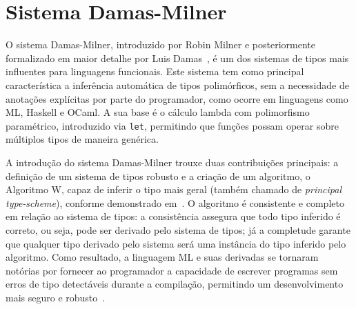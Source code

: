 \newcommand{\defas}{\ensuremath{\overset{def}{=}}}
\newcommand{\fv}{\ensuremath{\text{FV}}}
\newcommand{\fvc}{\ensuremath{\text{FVC}}}
\newcommand{\eeq}{\ensuremath{\overset{e}{=}}}
\newcommand{\Append}{\ensuremath{\texttt{++}}}
\newcommand{\If}{\ensuremath{\text{se}}}
\newcommand{\Let}{\ensuremath{\text{let}}}
\newcommand{\In}{\ensuremath{\text{in}}}
\newcommand{\Then}{\ensuremath{\text{então}}}
\newcommand{\Return}{\ensuremath{\text{retorna}}}
\newcommand{\Else}{\ensuremath{\text{senão}}}
\newcommand{\Elseif}{\ensuremath{\text{senão se}}}
\newcommand{\Fail}{\ensuremath{\text{falha}}}
\newcommand{\Unify}{\ensuremath{\textit{unify}}}
\newcommand{\Occurs}{\ensuremath{\textit{occurs}}}
\newcommand{\True}{\ensuremath{\texttt{Verdadeiro}}}
\newcommand{\False}{\ensuremath{\texttt{Falso}}}
\newcommand{\Whitespace}{\ensuremath{\texttt{ }}}
\newcommand{\TODO}[1]{\textcolor{red}{\textbf{TODO:} #1}}

\section{Sistema Damas-Milner}\label{sec:damas-milner}

O sistema Damas-Milner, introduzido por Robin Milner e posteriormente formalizado em maior detalhe por Luis Damas~\cite{MILNER1978, DAMAS1982}, é um dos sistemas de tipos mais influentes para linguagens funcionais.
Este sistema tem como principal característica a inferência automática de tipos polimórficos, sem a necessidade de anotações explícitas por parte do programador, como ocorre em linguagens como ML, Haskell e OCaml.
A sua base é o cálculo lambda com polimorfismo paramétrico, introduzido via \texttt{let}, permitindo que funções possam operar sobre múltiplos tipos de maneira genérica.

A introdução do sistema Damas-Milner trouxe duas contribuições principais: a definição de um sistema de tipos robusto e a criação de um algoritmo, o Algoritmo W, capaz de inferir o tipo mais geral (também chamado de \textit{principal type-scheme}), conforme demonstrado em~.
O algoritmo é consistente e completo em relação ao sistema de tipos: a consistência assegura que todo tipo inferido é correto, ou seja, pode ser derivado pelo sistema de tipos; já a completude garante que qualquer tipo derivado pelo sistema será uma instância do tipo inferido pelo algoritmo.
Como resultado, a linguagem ML e suas derivadas se tornaram notórias por fornecer ao programador a capacidade de escrever programas sem erros de tipo detectáveis durante a compilação, permitindo um desenvolvimento mais seguro e robusto~\cite{MILNER1978, DAMAS1984}.

